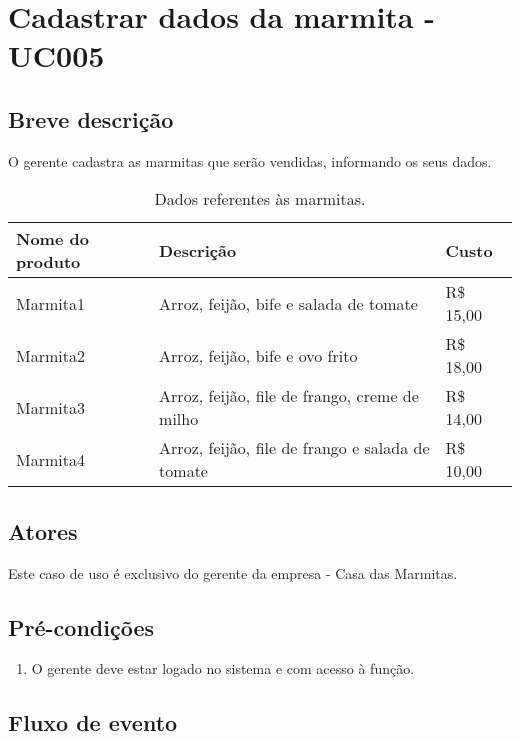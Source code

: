 \chapter{Cadastrar dados da marmita - UC005} \label{uc005}

\section{Breve descrição}

O gerente cadastra as marmitas que serão vendidas, informando os seus dados.

\begin{table}[htb]
	\ABNTEXfontereduzida
	\caption[Dados referentes às marmitas]{Dados referentes às marmitas.}
	\centering
	\label{tab-marmitas}
	\begin{tabular}{|p{4cm}|p{8cm}|p{2cm}|}
		\textbf{Nome do produto} & \textbf{Descrição}                               & \textbf{Custo} \\ \hline
		Marmita1                           & Arroz, feijão, bife e salada de tomate           & R\$ 15,00      \\ \hline
		Marmita2                           & Arroz, feijão, bife e ovo frito                  & R\$ 18,00      \\ \hline
		Marmita3                           & Arroz, feijão, file de frango, creme de milho    & R\$ 14,00      \\ \hline
		Marmita4                           & Arroz, feijão, file de frango e salada de tomate & R\$ 10,00
	\end{tabular}
\end{table}

\section{Atores}

Este caso de uso é exclusivo do gerente da empresa - Casa das Marmitas.

\section{Pré-condições}

\begin{enumerate}
	\item O gerente deve estar logado no sistema e com acesso à função.
\end{enumerate}

\section{Fluxo de evento}

